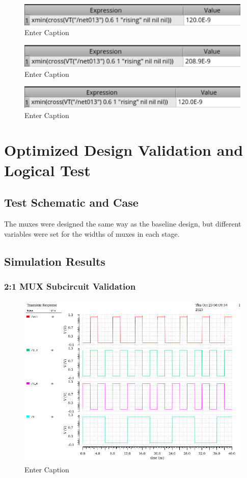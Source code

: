 \documentclass[12pt]{article}
\begin{document}
\begin{figure}[H]
    \centering
    \includegraphics[width=0.5\linewidth]{writeup//figures/wbuf3.png}
    \caption{Enter Caption}
\end{figure}


\begin{figure}[H]
    \centering
    \includegraphics[width=0.5\linewidth]{writeup//figures/wmux4.png}
    \caption{Enter Caption}
\end{figure}

\begin{figure}
    \centering
    \includegraphics[width=0.5\linewidth]{writeup//figures/wbuf4.png}
    \caption{Enter Caption}
\end{figure}



\newpage

\section{Optimized Design Validation and Logical Test}
\subsection{Test Schematic and Case}
The muxes were designed the same way as the baseline design, but different variables were set for the widths of muxes in each stage. 



\newpage

\subsection{Simulation Results}
\subsubsection*{2:1 MUX Subcircuit Validation}
\begin{figure}[H]
    \centering
    \includegraphics[width=0.5\linewidth]{writeup//figures/muxsubval.png}
    \caption{Enter Caption}
\end{figure}
\end{document}
